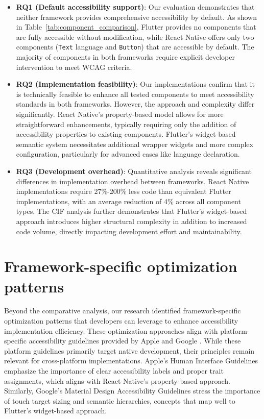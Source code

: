 \begin{itemize}
    \item \textbf{RQ1 (Default accessibility support)}: Our evaluation demonstrates that neither framework provides comprehensive accessibility by default. As shown in Table~\ref{tab:component_comparison}, Flutter provides no components that are fully accessible without modification, while React Native offers only two components (\texttt{Text} language and \texttt{Button}) that are accessible by default. The majority of components in both frameworks require explicit developer intervention to meet WCAG criteria.

    \item \textbf{RQ2 (Implementation feasibility)}: Our implementations confirm that it is technically feasible to enhance all tested components to meet accessibility standards in both frameworks. However, the approach and complexity differ significantly. React Native's property-based model allows for more straightforward enhancements, typically requiring only the addition of accessibility properties to existing components. Flutter's widget-based semantic system necessitates additional wrapper widgets and more complex configuration, particularly for advanced cases like language declaration.

    \item \textbf{RQ3 (Development overhead)}: Quantitative analysis reveals significant differences in implementation overhead between frameworks. React Native implementations require 27\%-200\% less code than equivalent Flutter implementations, with an average reduction of 4\% across all component types. The CIF analysis further demonstrates that Flutter's widget-based approach introduces higher structural complexity in addition to increased code volume, directly impacting development effort and maintainability.
\end{itemize}

\section{Framework-specific optimization patterns}
\label{sec:optimization-patterns}

Beyond the comparative analysis, our research identified framework-specific optimization patterns that developers can leverage to enhance accessibility implementation efficiency. 
These optimization approaches align with platform-specific accessibility guidelines provided by Apple \cite{apple-accessibility} and Google \cite{google-accessibility}. While these platform guidelines primarily target native development, their principles remain relevant for cross-platform implementations. Apple's Human Interface Guidelines emphasize the importance of clear accessibility labels and proper trait assignments, which aligns with React Native's property-based approach. Similarly, Google's Material Design Accessibility Guidelines stress the importance of touch target sizing and semantic hierarchies, concepts that map well to Flutter's widget-based approach.

